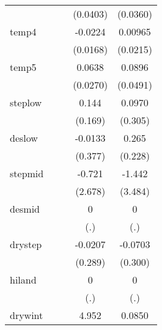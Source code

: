 {\begin{tabular}{l*{4}{c}}
            &                     &                     &    (0.0403)         &    (0.0360)         \\
[1em]
temp4       &                     &                     &     -0.0224         &     0.00965         \\
            &                     &                     &    (0.0168)         &    (0.0215)         \\
[1em]
temp5       &                     &                     &      0.0638\sym{*}  &      0.0896         \\
            &                     &                     &    (0.0270)         &    (0.0491)         \\
[1em]
steplow     &                     &                     &       0.144         &      0.0970         \\
            &                     &                     &     (0.169)         &     (0.305)         \\
[1em]
deslow      &                     &                     &     -0.0133         &       0.265         \\
            &                     &                     &     (0.377)         &     (0.228)         \\
[1em]
stepmid     &                     &                     &      -0.721         &      -1.442         \\
            &                     &                     &     (2.678)         &     (3.484)         \\
[1em]
desmid      &                     &                     &           0         &           0         \\
            &                     &                     &         (.)         &         (.)         \\
[1em]
drystep     &                     &                     &     -0.0207         &     -0.0703         \\
            &                     &                     &     (0.289)         &     (0.300)         \\
[1em]
hiland      &                     &                     &           0         &           0         \\
            &                     &                     &         (.)         &         (.)         \\
[1em]
drywint     &                     &                     &       4.952         &      0.0850         \\

\end{tabular}}
